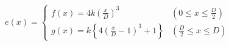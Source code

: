 \documentclass[
  11pt,
  border=2,
  convert={
    density=100 -alpha remove,
    outext=.png
  },
]{standalone}
\begin{document}
$
  e(x) = \begin{cases}
    \displaystyle f(x) = 4k\left(\frac{x}{D}\right)^{3}
      & \left(0 \leq x \leq \frac{D}{2}\right)
    \\
    \displaystyle g(x) = k\left\{4\left(\frac{x}{D} - 1\right)^{3} + 1\right\}
      & \left(\frac{D}{2} \leq x \leq D\right)
  \end{cases}
$
\end{document}

